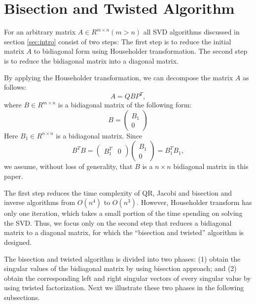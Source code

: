 \section{Bisection and Twisted Algorithm}
\label{sec:algorithm}
For an arbitrary matrix $A\in R^{m \times n} (m>n)$ all SVD algorithms discussed in section \ref{sec:intro} consist of two steps:
The first step is to reduce the initial matrix $A$ to bidiagonal form using Householder transformation.
The second step is to reduce the bidiagonal matrix into a diagonal matrix.

By applying the Householder transformation, we can decompose the matrix $A$ as follows:
\begin{equation}
\label{H-transform}
A = Q B P^T ,
\end{equation}
where $B \in R^{m \times n}$ is a bidiagonal matrix of the following form:
\begin{equation}
B = \left( \begin{array}{c}
      B_1 \\
      0  
\end{array} \right) 
\end{equation}
Here $B_1 \in R^{n \times n}$ is a bidiagonal matrix. Since 
\[
B^T B = \left( \begin{array}{cc }B_1^T & 0 \end{array} \right) \left( \begin{array}{c} B_1 \\ 0  \end{array} \right) = B_1^T B_1,
\]
we assume, without loss of generality, that $B$ is a $n \times n$ bidiagonal matrix in this paper.
 
The first step reduces the time complexity of QR, Jacobi and bisection and inverse algorithms 
from $O(n^4)$ to $O(n^3)$. 
However, Householder transform has only one iteration, which takes a small portion of the time spending on solving the SVD.
Thus, we focus only on the second step that reduces a bidiagonal matrix to a diagonal matrix, for which the  ``bisection and twisted'' algorithm is designed.

The bisection and twisted algorithm is divided into two phases:
(1) obtain the singular values of the bidiagonal matrix by using bisection approach; and
(2) obtain the corresponding left and right singular vectors of every singular value by using twisted factorization.
Next we illustrate these two phases in the following subsections.

